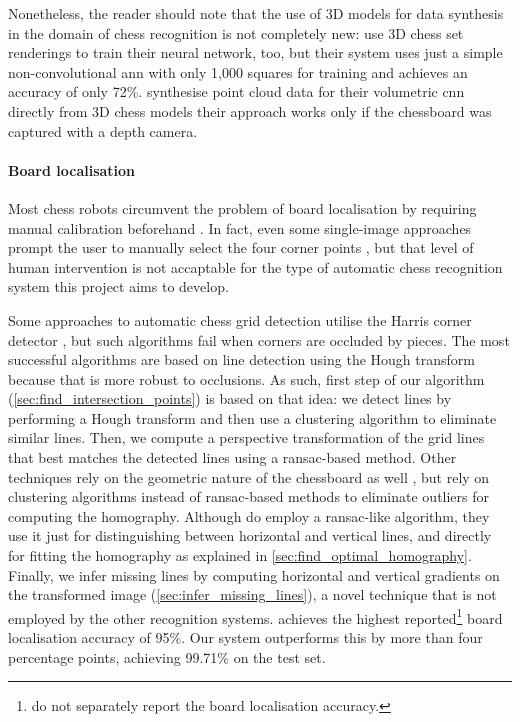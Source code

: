 \documentclass[../main.tex]{subfiles}
\begin{document}
Nonetheless, the reader should note that the use of 3D models for data synthesis in the domain of chess recognition is not completely new:
\textcite{hou} use 3D chess set renderings to train their neural network, too, but their system uses just a simple non-convolutional \gls{ann} with only 1,000 squares for training and achieves an accuracy of only 72\%.
\textcite{wei2017} synthesise point cloud data for their volumetric \gls{cnn} directly from 3D chess models their approach works only if the chessboard was captured with a depth camera.

\paragraph{Board localisation}
Most chess robots circumvent the problem of board localisation by requiring manual calibration beforehand \cite{goncalves2005,sokic2008,khan2014}.
In fact, even some single-image approaches prompt the user to manually select the four corner points \cite{danner2015}, but that level of human intervention is not accaptable for the type of automatic chess recognition system this project aims to develop.

Some approaches to automatic chess grid detection utilise the Harris corner detector \cite{banerjee2012,hack2014}, but such algorithms fail when corners are occluded by pieces.
The most successful algorithms are based on line detection using the Hough transform \cite{tam2008,neufeld2010,danner2015,chen2016,kanchibail2016,xie2018a,chen2019} because that is more robust to occlusions.
As such, first step of our algorithm (\cref{sec:find_intersection_points}) is based on that idea: we detect lines by performing a Hough transform and then use a clustering algorithm to eliminate similar lines.
Then, we compute a perspective transformation of the grid lines that best matches the detected lines using a \gls{ransac}-based method.
Other techniques rely on the geometric nature of the chessboard as well \cite{tam2008,hack2014,danner2015,xie2018}, but rely on clustering algorithms instead of \gls{ransac}-based methods to eliminate outliers for computing the homography.
Although \textcite{hack2014} do employ a \gls{ransac}-like algorithm, they use it just for distinguishing between horizontal and vertical lines, and directly for fitting the homography as explained in \cref{sec:find_optimal_homography}.
Finally, we infer missing lines by computing horizontal and vertical gradients on the transformed image (\cref{sec:infer_missing_lines}), a novel technique that is not employed by the other recognition systems.
\Textcite{czyzewski2020} achieves the highest reported\footnote{ do not separately report the board localisation accuracy.} board localisation accuracy of 95\%.
Our system outperforms this by more than four percentage points, achieving 99.71\% on the test set.
\end{document}
